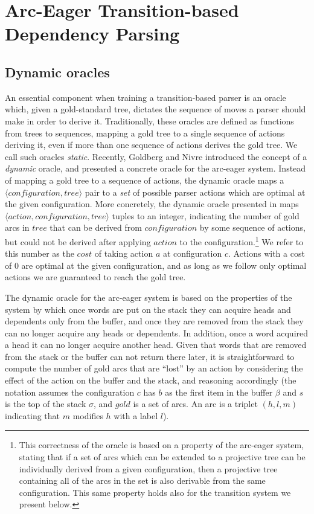 \documentclass[11pt,letterpaper]{article}
\newcommand{\tuple}[1]{$\langle#1\rangle$}
\begin{document}
\section{Arc-Eager Transition-based Dependency Parsing}

\subsection{Dynamic oracles}
\label{ref:oracle}

An essential component when training a transition-based parser is an oracle
which, given a gold-standard tree, dictates the sequence of moves a parser
should make in order to derive it.  Traditionally, these oracles are defined
as functions from trees to sequences, mapping a gold tree to a single sequence
of actions deriving it, even if more than one sequence of actions derives the
gold tree. We call such oracles \emph{static}.  Recently, Goldberg and Nivre
 introduced the concept of a \emph{dynamic} oracle, and
presented a concrete oracle for the arc-eager system.  Instead of mapping a
gold tree to a sequence of actions, the dynamic oracle maps a
\tuple{configuration, tree} pair to a \emph{set} of possible parser actions
which are optimal at the given configuration.  More concretely, the dynamic
oracle presented in \cite{coling2012} maps \tuple{action,configuration,tree}
tuples to an integer, indicating the number of gold arcs in $tree$ that can be
derived from $configuration$ by some sequence of actions, but could not be derived
after applying $action$ to the configuration.\footnote{This correctness of
the oracle is based on a property of the arc-eager system, stating that if a
set of arcs which can be extended to a projective tree can be individually
derived from a given configuration, then a projective tree containing all of
the arcs in the set is also derivable from the same configuration.  This same
property holds also for the transition system we present below.} We refer to
this number as the $cost$ of taking action $a$ at configuration $c$. Actions
with a cost of 0 are optimal at the given configuration, and as long as we
follow only optimal actions we are guaranteed to reach the gold tree.

The dynamic oracle for the arc-eager system is based on the properties of the
system by which once words are put on the stack they can acquire heads and
dependents only from the buffer, and once they are removed from the stack they
can no longer acquire any heads or dependents. In addition, once a word
acquired a head it can no longer acquire another head.  Given that words that
are removed from the stack or the buffer can not return there later, it
is straightforward to compute the number of gold arcs that are ``lost'' by an
action by considering the effect of the action on the buffer and the stack,
and reasoning accordingly (the notation assumes the configuration $c$ has $b$
as the first item in the buffer $\beta$ and $s$ is the top of the stack
$\sigma$, and $gold$ is a set of arcs. An arc is a triplet $(h,l,m)$
indicating that $m$ modifies $h$ with a label $l$).
\end{document}
